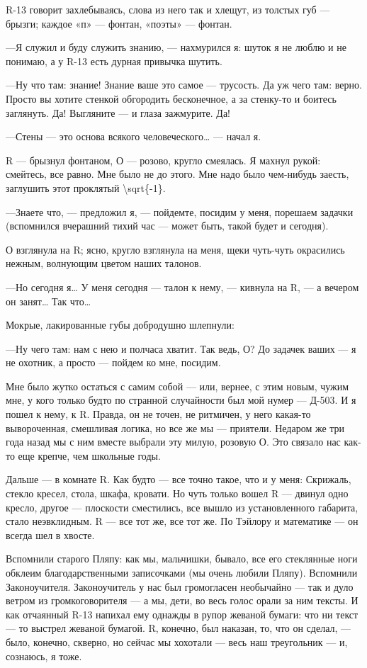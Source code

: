 \documentclass[11pt,openany]{book}
\begin{document}
R-13 говорит захлебываясь, слова из него так и хлещут, из толстых губ --- брызги; каждое «п» --- фонтан, «поэты» --- фонтан.

---Я служил и буду служить знанию, --- нахмурился я: шуток я не люблю и не понимаю, а у R-13 есть дурная привычка шутить.

---Ну что там: знание! Знание ваше это самое --- трусость. Да уж чего там: верно. Просто вы хотите стенкой обгородить бесконечное, а за стенку-то и боитесь заглянуть. Да! Выгляните --- и глаза зажмурите. Да!

---Стены --- это основа всякого человеческого\ldots{} --- начал я.

R --- брызнул фонтаном, О --- розово, кругло смеялась. Я махнул рукой: смейтесь, все равно. Мне было не до этого. Мне надо было чем-нибудь заесть, заглушить этот проклятый \textbackslash{}sqrt\{-1\}.

---Знаете что, --- предложил я, --- пойдемте, посидим у меня, порешаем задачки (вспомнился вчерашний тихий час --- может быть, такой будет и сегодня).

О взглянула на R; ясно, кругло взглянула на меня, щеки чуть-чуть окрасились нежным, волнующим цветом наших талонов.

---Но сегодня я\ldots{} У меня сегодня --- талон к нему, --- кивнула на R, --- а вечером он занят\ldots{} Так что\ldots{}

Мокрые, лакированные губы добродушно шлепнули:

---Ну чего там: нам с нею и полчаса хватит. Так ведь, О? До задачек ваших --- я не охотник, а просто --- пойдем ко мне, посидим.

Мне было жутко остаться с самим собой --- или, вернее, с этим новым, чужим мне, у кого только будто по странной случайности был мой нумер --- Д-503. И я пошел к нему, к R. Правда, он не точен, не ритмичен, у него какая-то вывороченная, смешливая логика, но все же мы --- приятели. Недаром же три года назад мы с ним вместе выбрали эту милую, розовую О. Это связало нас как-то еще крепче, чем школьные годы.

Дальше --- в комнате R. Как будто --- все точно такое, что и у меня: Скрижаль, стекло кресел, стола, шкафа, кровати. Но чуть только вошел R --- двинул одно кресло, другое --- плоскости сместились, все вышло из установленного габарита, стало неэвклидным. R --- все тот же, все тот же. По Тэйлору и математике --- он всегда шел в хвосте.

Вспомнили старого Пляпу: как мы, мальчишки, бывало, все его стеклянные ноги обклеим благодарственными записочками (мы очень любили Пляпу). Вспомнили Законоучителя. Законоучитель у нас был громогласен необычайно --- так и дуло ветром из громкоговорителя --- а мы, дети, во весь голос орали за ним тексты. И как отчаянный R-13 напихал ему однажды в рупор жеваной бумаги: что ни текст --- то выстрел жеваной бумагой. R, конечно, был наказан, то, что он сделал, --- было, конечно, скверно, но сейчас мы хохотали --- весь наш треугольник --- и, сознаюсь, я тоже.
\end{document}

